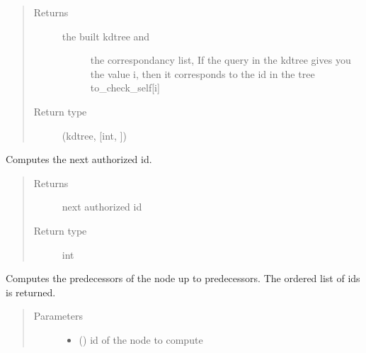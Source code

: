 \documentclass[letterpaper,10pt,english]{sphinxmanual}
\begin{document}
\begin{fulllineitems}
\begin{fulllineitems}
\begin{quote}
\begin{description}
\item[{Returns}] \leavevmode
\begin{description}
\item[{the built kdtree and}] \leavevmode
the correspondancy list,
If the query in the kdtree gives you the value i,
then it corresponds to the id in the tree to\_check\_self{[}i{]}

\end{description}


\item[{Return type}] \leavevmode
(kdtree, {[}int, {]})

\end{description}\end{quote}

\end{fulllineitems}


\begin{fulllineitems}
\label{\detokenize{index:LineageTree.lineageTree.get_next_id}}
Computes the next authorized id.
\begin{quote}\begin{description}
\item[{Returns}] \leavevmode
next authorized id

\item[{Return type}] \leavevmode
int

\end{description}\end{quote}

\end{fulllineitems}


\begin{fulllineitems}
\label{\detokenize{index:LineageTree.lineageTree.get_predecessors}}
Computes the predecessors of the node  up to
 predecessors. The ordered list of ids is returned.
\begin{quote}\begin{description}
\item[{Parameters}] \leavevmode\begin{itemize}
\item {} 
 () \textendash{} id of the node to compute


\end{itemize}
\end{description}
\end{quote}
\end{fulllineitems}
\end{fulllineitems}
\end{document}

